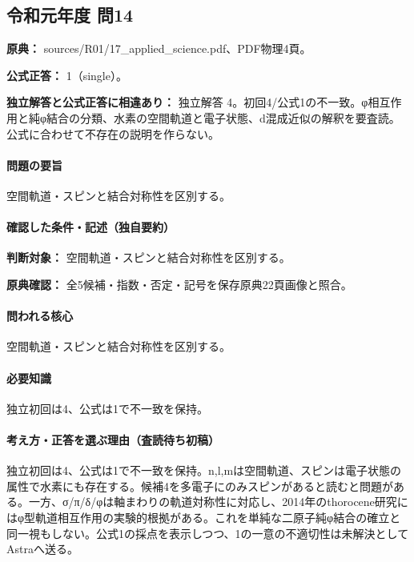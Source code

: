 \subsection{令和元年度 問14}
\label{q:r01-reg-applied-14}

\noindent\textbf{原典：} sources/R01/17\_applied\_science.pdf、PDF物理4頁。

\textbf{公式正答：} 1（single）。

\par\textbf{独立解答と公式正答に相違あり：} 独立解答 4。初回4/公式1の不一致。φ相互作用と純φ結合の分類、水素の空間軌道と電子状態、d混成近似の解釈を要査読。公式に合わせて不存在の説明を作らない。

\paragraph{問題の要旨} 空間軌道・スピンと結合対称性を区別する。

\paragraph{確認した条件・記述（独自要約）}\mbox{}\par

\noindent\textbf{判断対象：} 空間軌道・スピンと結合対称性を区別する。\par

\noindent\textbf{原典確認：} 全5候補・指数・否定・記号を保存原典22頁画像と照合。\par

\paragraph{問われる核心} 空間軌道・スピンと結合対称性を区別する。

\paragraph{必要知識} 独立初回は4、公式は1で不一致を保持。

\paragraph{考え方・正答を選ぶ理由（査読待ち初稿）} 独立初回は4、公式は1で不一致を保持。n,l,mは空間軌道、スピンは電子状態の属性で水素にも存在する。候補4を多電子にのみスピンがあると読むと問題がある。一方、σ/π/δ/φは軸まわりの軌道対称性に対応し、2014年のthorocene研究にはφ型軌道相互作用の実験的根拠がある。これを単純な二原子純φ結合の確立と同一視もしない。公式1の採点を表示しつつ、1の一意の不適切性は未解決としてAstraへ送る。

